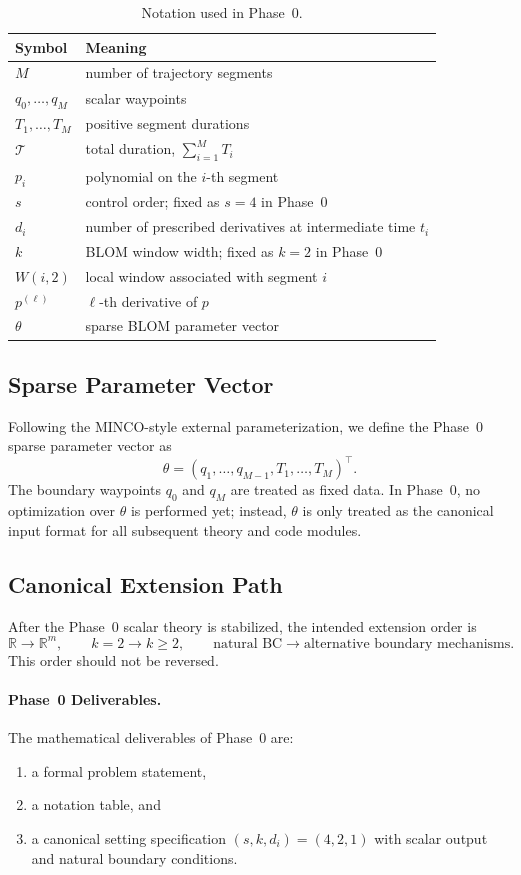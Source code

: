 \begin{table}[h]
\centering
\caption{Notation used in Phase~0.}
\label{tab:phase0_notation}
\begin{tabular}{ll}
\hline
Symbol & Meaning \\
\hline
$M$ & number of trajectory segments \\
$q_0,\dots,q_M$ & scalar waypoints \\
$T_1,\dots,T_M$ & positive segment durations \\
$\mathcal T$ & total duration, $\sum_{i=1}^{M} T_i$ \\
$p_i$ & polynomial on the $i$-th segment \\
$s$ & control order; fixed as $s=4$ in Phase~0 \\
$d_i$ & number of prescribed derivatives at intermediate time $t_i$ \\
$k$ & BLOM window width; fixed as $k=2$ in Phase~0 \\
$W(i,2)$ & local window associated with segment $i$ \\
$p^{(\ell)}$ & $\ell$-th derivative of $p$ \\
$\theta$ & sparse BLOM parameter vector \\
\hline
\end{tabular}
\end{table}

\subsection{Sparse Parameter Vector}
\label{subsec:phase0_theta}

Following the MINCO-style external parameterization, we define the Phase~0 sparse parameter vector as
\begin{equation}
\label{eq:phase0_theta}
\theta
=
(q_1,\dots,q_{M-1}, T_1,\dots,T_M)^\top.
\end{equation}
The boundary waypoints $q_0$ and $q_M$ are treated as fixed data.
In Phase~0, no optimization over $\theta$ is performed yet; instead, $\theta$ is only treated as the canonical input format for all subsequent theory and code modules.

\subsection{Canonical Extension Path}
\label{subsec:phase0_extension}

After the Phase~0 scalar theory is stabilized, the intended extension order is
\[
\mathbb R
\longrightarrow
\mathbb R^m,
\qquad
k=2
\longrightarrow
k\ge 2,
\qquad
\text{natural BC}
\longrightarrow
\text{alternative boundary mechanisms}.
\]
This order should not be reversed.

\paragraph{Phase~0 Deliverables.}
The mathematical deliverables of Phase~0 are:
\begin{enumerate}
  \item a formal problem statement,
  \item a notation table, and
  \item a canonical setting specification $(s,k,d_i)=(4,2,1)$ with scalar output and natural boundary conditions.
\end{enumerate}
